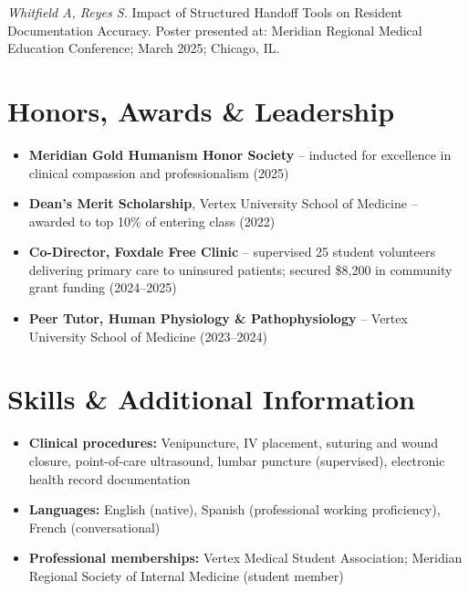 \documentclass[10pt,letterpaper]{article}
\begin{document}
\textit{Whitfield A, Reyes S.} Impact of Structured Handoff Tools on Resident Documentation Accuracy. Poster presented at: Meridian Regional Medical Education Conference; March 2025; Chicago, IL.

\section{Honors, Awards \& Leadership}
\begin{itemize}
  \item \textbf{Meridian Gold Humanism Honor Society} -- inducted for excellence in clinical compassion and professionalism (2025)
  \item \textbf{Dean's Merit Scholarship}, Vertex University School of Medicine -- awarded to top 10\% of entering class (2022)
  \item \textbf{Co-Director, Foxdale Free Clinic} -- supervised 25 student volunteers delivering primary care to uninsured patients; secured \$8,200 in community grant funding (2024--2025)
  \item \textbf{Peer Tutor, Human Physiology \& Pathophysiology} -- Vertex University School of Medicine (2023--2024)
\end{itemize}

\section{Skills \& Additional Information}
\begin{itemize}
  \item \textbf{Clinical procedures:} Venipuncture, IV placement, suturing and wound closure, point-of-care ultrasound, lumbar puncture (supervised), electronic health record documentation
  \item \textbf{Languages:} English (native), Spanish (professional working proficiency), French (conversational)
  \item \textbf{Professional memberships:} Vertex Medical Student Association; Meridian Regional Society of Internal Medicine (student member)
\end{itemize}
\end{document}
